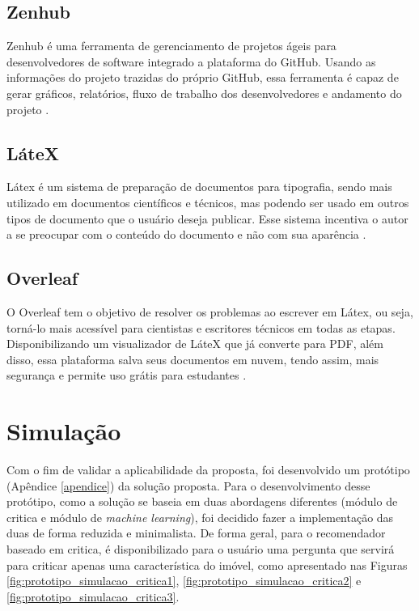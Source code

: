 \subsection{Zenhub}

Zenhub é uma ferramenta de gerenciamento de projetos ágeis para desenvolvedores de software integrado a plataforma do GitHub. Usando as informações do projeto trazidas do próprio GitHub, essa ferramenta é capaz de gerar gráficos, relatórios, fluxo de trabalho dos desenvolvedores e andamento do projeto \cite{zenhub:2019}.

\subsection{LáteX}

Látex é um sistema de preparação de documentos para tipografia, sendo mais utilizado em documentos científicos e técnicos, mas podendo ser usado em outros tipos de documento que o usuário deseja publicar. Esse sistema incentiva o autor a se preocupar com o conteúdo do documento e não com sua aparência \cite{latex:2019}.

\subsection{Overleaf}

O Overleaf tem o objetivo de resolver os problemas ao escrever em Látex, ou seja, torná-lo mais acessível para cientistas e escritores técnicos em todas as etapas. Disponibilizando um visualizador de LáteX que já converte para PDF, além disso, essa plataforma salva seus documentos em nuvem, tendo assim, mais segurança e permite uso grátis para estudantes \cite{overleaf:2019}.

\section{Simulação}

Com o fim de validar a aplicabilidade da proposta, foi desenvolvido um protótipo (Apêndice \ref{apendice}) da solução proposta. Para o desenvolvimento desse protótipo, como a solução se baseia em duas abordagens diferentes (módulo de critica e módulo de \textit{machine learning}), foi decidido fazer a implementação das duas de forma reduzida e minimalista. De forma geral, para o recomendador baseado em critica, é disponibilizado para o usuário uma pergunta que servirá para criticar apenas uma característica do imóvel, como apresentado nas Figuras \ref{fig:prototipo_simulacao_critica1}, \ref{fig:prototipo_simulacao_critica2} e \ref{fig:prototipo_simulacao_critica3}.


